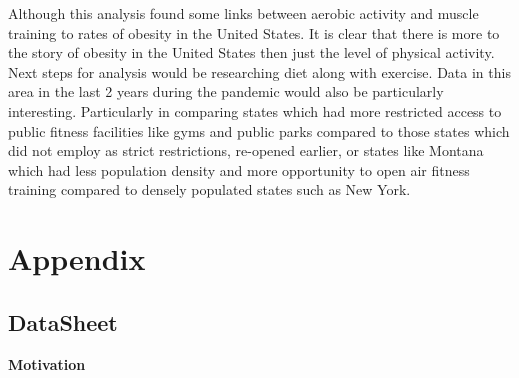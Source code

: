 \documentclass[
]{article}
\begin{document}
Although this analysis found some links between aerobic activity and
muscle training to rates of obesity in the United States. It is clear
that there is more to the story of obesity in the United States then
just the level of physical activity. Next steps for analysis would be
researching diet along with exercise. Data in this area in the last 2
years during the pandemic would also be particularly interesting.
Particularly in comparing states which had more restricted access to
public fitness facilities like gyms and public parks compared to those
states which did not employ as strict restrictions, re-opened earlier,
or states like Montana which had less population density and more
opportunity to open air fitness training compared to densely populated
states such as New York.

\newpage

\appendix

\hypertarget{appendix}{%
\section*{Appendix}\label{appendix}}

\hypertarget{datasheet}{%
\subsection*{DataSheet}\label{datasheet}}

\textbf{Motivation}
\end{document}

